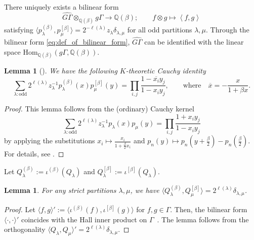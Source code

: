 \documentclass{amsart}
\newtheorem{lemma}[thm]{Lemma}
\def\QQ{\mathord{\mathbb{Q}}}
\begin{document}
There uniquely exists a bilinear form
\begin{equation}\label{eq:def_of_bilinear_form}
\widehat{G\Gamma}\otimes_{\QQ(\beta)}g\Gamma\to \QQ(\beta);\qquad
f\otimes g\mapsto 
\left\langle
f,g
\right\rangle
\end{equation} 
satisfying $
\langle
p_\lambda^{(\beta)}, p_\mu^{[\beta]}
\rangle=
2^{-\ell(\lambda)} z_\lambda\delta_{\lambda,\mu}$ for all odd partitions $\lambda,\mu$.
Through the bilinear form \eqref{eq:def_of_bilinear_form}, $\widehat{G\Gamma}$ can be identified with the linear space $\mathrm{Hom}_{\QQ(\beta)}(g\Gamma,\QQ(\beta))$.

\begin{lemma}[{\cite[\S 8]{iwao2021neutralfermionic}}]\label{lemma:Cauchy}
We have the following $K$-theoretic Cauchy identity
\[
\sum_{\lambda:\mathrm{odd}}2^{\ell(\lambda)}z_\lambda^{-1}
p_\lambda^{(\beta)}(x)p_\mu^{[\beta]}(y)=
\prod_{i,j}\frac{1-\overline{x_i}y_j}{1-x_iy_j},\qquad
\mbox{where}\quad \overline{x}=-\frac{x}{1+\beta x}.
\]
\end{lemma}
\begin{proof}
This lemma follows from the (ordinary) Cauchy kernel
\[
\sum_{\lambda:\mathrm{odd}}2^{\ell(\lambda)}z_\lambda^{-1}
p_\lambda(x)p_\mu(y)=
\prod_{i,j}\frac{1+x_iy_j}{1-x_iy_j}
\]
by applying the substitutions $x_i\mapsto \frac{x_i}{1+\frac{\beta}{2}x_i}$ and $p_n(y)\mapsto p_n(y+\frac{\beta}{2})-p_n(\frac{\beta}{2})$.
For details, see \cite[\S 8]{iwao2021neutralfermionic}.
\end{proof}

Let
$Q^{(\beta)}_\lambda:=\iota^{(\beta)}(Q_\lambda)$ and 
$Q^{[\beta]}_\lambda:=\iota^{[\beta]}(Q_\lambda)$.

\begin{lemma}\label{lemma:beta_Q_dual}
For any strict partitions $\lambda,\mu$, we have
$
\langle
Q^{(\beta)}_\lambda,
Q^{[\beta]}_\mu
\rangle
=2^{\ell(\lambda)}\delta_{\lambda,\mu}
$.
\end{lemma}
\begin{proof}
Let $\langle f,g\rangle':=\langle \iota^{(\beta)}(f),\iota^{[\beta]}(g)\rangle$ for $f,g\in \Gamma$.
Then, the bilinear form $\langle \cdot,\cdot \rangle'$ coincides with the Hall inner product on $\Gamma$~\cite[\S III.8]{macdonald1998symmetric}.
The lemma follows from the orthogonality $\langle Q_\lambda,Q_\mu\rangle'=2^{\ell(\lambda)}\delta_{\lambda,\mu}$.
\end{proof}
\end{document}
